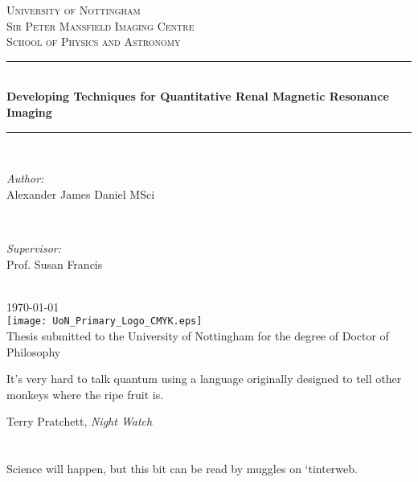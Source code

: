 \documentclass[12pt,a4paper,oneside]{report}
\author{Alexander James Daniel}
\makeatletter
\newcommand\blankpage{
    \null
    \thispagestyle{empty}
    \addtocounter{page}{-1}
    \newpage}
\renewenvironment{abstract}{
	\if@twocolumn
	\section*{\abstractname}
	\else
	\small
	\begin{center}
		{\bfseries \abstractname\vspace{-.5em}\vspace{\z@}}%
	\end{center}
	\quotation
	\fi}
{\if@twocolumn\else\endquotation\fi}
\makeatother
\begin{document}
{
\begin{titlepage}
\newcommand{\HRule}{\rule{\linewidth}{0.5mm}}
\center
 
\textsc{\LARGE University of Nottingham}\\[0.5cm]
\textsc{\Large Sir Peter Mansfield Imaging Centre}\\[0.5cm]
\textsc{\large School of Physics and Astronomy}\\[0.5cm]

\HRule \\[0.4cm]
{ \Large \bfseries Developing Techniques for Quantitative Renal Magnetic Resonance Imaging}\\[0.2cm]
\HRule \\[1.5cm]

\begin{minipage}{0.4\textwidth}
\begin{flushleft} \large
\emph{Author:}\\
Alexander James Daniel MSci
\end{flushleft}
\end{minipage}
~
\begin{minipage}{0.4\textwidth}
\begin{flushright} \large
\emph{Supervisor:} \\
Prof. Susan Francis
\end{flushright}
\end{minipage}\\[4cm]
{\large \today}\\[2cm]

\texttt{[image: UoN\_Primary\_Logo\_CMYK.eps]}\\[1cm]
Thesis submitted to the University of Nottingham for the degree of Doctor of Philosophy
\vfill
\end{titlepage}
}
\pagestyle{plain}

\vspace*{200px}

\epigraph{\large{It’s very hard to talk quantum using a language originally designed to tell other monkeys where the ripe fruit is.}}{\normalsize{Terry Pratchett, \textit{Night Watch}}}
\newpage

\begin{abstract}
	Science will happen, but this bit can be read by muggles on `tinterweb.
\end{abstract}
\setcounter{tocdepth}{2}
\end{document}
